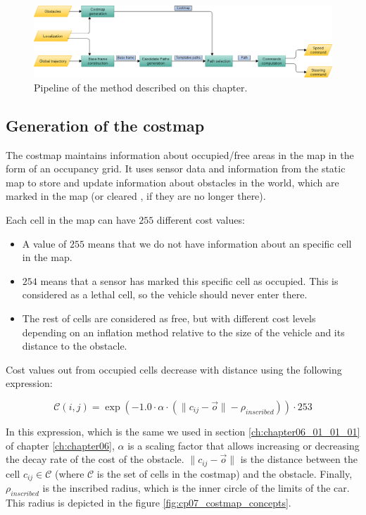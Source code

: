 \begin{figure}[h!]
        \centering
        \includegraphics[width=\textwidth]{pipeline}
        \caption{Pipeline of the method described on this chapter.}\label{fig:cp07_pipeline}
\end{figure}

\subsection{Generation of the costmap}\label{ch:chapter07_01_01}

The costmap maintains information about occupied/free areas in the map in the form of an occupancy grid. It uses sensor data and information from the static map to store and update information about obstacles in the world, which are marked in the map (or cleared , if they are no longer there).

Each cell in the map can have $255$ different cost values:
\begin{itemize}
 \item A value of $255$ means that we do not have information about an specific cell in the map.
 \item $254$ means that a sensor has marked this specific cell as occupied. This is considered as a lethal cell, so the vehicle should never enter there.
 \item The rest of cells are considered as free, but with different cost levels depending on an inflation method relative to the size of the vehicle and its distance to the obstacle.
\end{itemize}

Cost values out from occupied cells decrease with distance using the following expression:

\begin{equation}\label{eq:cp07_costmap_inflation}
 \mathcal{C}(i, j) = \exp (-1.0 \cdot \alpha \cdot ( \|c_{ij}-\vec{o}\| - \rho_{inscribed})) \cdot 253
\end{equation}

In this expression, which is the same we used in section \ref{ch:chapter06_01_01_01} of chapter \ref{ch:chapter06}, $\alpha$ is a scaling factor that allows increasing or decreasing the decay rate of the cost of the obstacle. $\|c_{ij}-\vec{o}\|$ is the distance between the cell $c_{ij} \in \mathcal{C}$ (where $\mathcal{C}$ is the set of cells in the costmap) and the obstacle. Finally, $\rho_{inscribed}$ is the inscribed radius, which is the inner circle of the limits of the car. This radius is depicted in the figure \ref{fig:cp07_costmap_concepts}.

